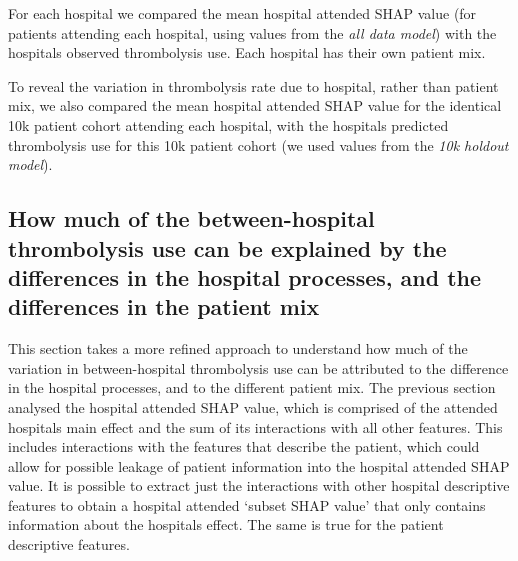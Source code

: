 For each hospital we compared the mean hospital attended SHAP value (for patients attending each hospital, using values from the \emph{all data model}) with the hospitals observed thrombolysis use. Each hospital has their own patient mix.

To reveal the variation in thrombolysis rate due to hospital, rather than patient mix, we also compared the mean hospital attended SHAP value for the identical 10k patient cohort attending each hospital, with the hospitals predicted thrombolysis use for this 10k patient cohort (we used values from the \emph{10k holdout model}).



\subsection{How much of the between-hospital thrombolysis use can be explained by the differences in the hospital processes, and the differences in the patient mix}%


This section takes a more refined approach to understand how much of the variation in between-hospital thrombolysis use can be attributed to the difference in the hospital processes, and to the different patient mix. The previous section analysed the hospital attended SHAP value, which is comprised of the attended hospitals main effect and the sum of its interactions with all other features. This includes interactions with the features that describe the patient, which could allow for possible leakage of patient information into the hospital attended SHAP value. It is possible to extract just the interactions with other hospital descriptive features to obtain a hospital attended `subset SHAP value' that only contains information about the hospitals effect. The same is true for the patient descriptive features.

